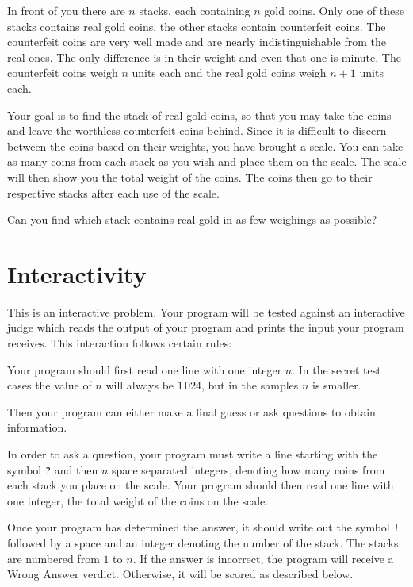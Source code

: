 
In front of you there are $n$ stacks, each containing $n$ gold coins.
Only one of these stacks contains real gold coins, the other stacks contain counterfeit coins.
The counterfeit coins are very well made and are nearly indistinguishable from the real ones.
The only difference is in their weight and even that one is minute.
The counterfeit coins weigh $n$ units each and the real gold coins weigh $n+1$ units each.

Your goal is to find the stack of real gold coins,
so that you may take the coins and leave the worthless counterfeit coins behind.
Since it is difficult to discern between the coins based on their weights, you have brought a scale.
You can take as many coins from each stack as you wish and place them on the scale.
The scale will then show you the total weight of the coins.
The coins then go to their respective stacks after each use of the scale.

Can you find which stack contains real gold in as few weighings as possible?

\section*{Interactivity}
This is an interactive problem.
Your program will be tested against an interactive judge which reads the output of your program and prints the input your program receives.
This interaction follows certain rules:

Your program should first read one line with one integer $n$.
In the secret test cases the value of $n$ will always be $1\,024$, but in the samples $n$ is smaller.

Then your program can either make a final guess or ask questions to obtain information.

In order to ask a question, your program must write a line starting with the symbol \texttt{?} and
then $n$ space separated integers, denoting how many coins from each stack you place on the scale.
Your program should then read one line with one integer, the total weight of the coins on the scale.

Once your program has determined the answer, it should write out the symbol \texttt{!} followed by a space and an integer denoting the number of the stack.
The stacks are numbered from $1$ to $n$.
If the answer is incorrect, the program will receive a Wrong Answer verdict. Otherwise, it will be scored as described below.

